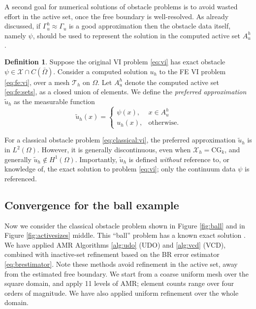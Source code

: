\documentclass[]{interact}
\theoremstyle{plain}%
\theoremstyle{definition}
\newtheorem{definition}[theorem]{Definition}
\theoremstyle{remark}
\newcommand{\cT}{\mathcal{T}}
\newcommand{\cX}{\mathcal{X}}
\newcommand{\CG}{\text{CG}}
\begin{document}
A second goal for numerical solutions of obstacle problems is to avoid wasted effort in the active set, once the free boundary is well-resolved.  As already discussed, if $\Gamma_u^h \approx \Gamma_u$ is a good approximation then the obstacle data itself, namely $\psi$, should be used to represent the solution in the computed active set $A_u^h$.

\begin{definition} \label{def:preferred}
Suppose the original VI problem \eqref{eq:vi} has exact obstacle $\psi \in \cX\cap C(\bar\Omega)$.  Consider a computed solution $u_h$ to the FE VI problem \eqref{eq:fe:vi}, over a mesh $\cT_h$ on $\Omega$.  Let $A_u^h$ denote the computed active set \eqref{eq:fe:sets}, as a closed union of elements.  We define the \emph{preferred approximation} $\tilde u_h$ as the measurable function
\begin{equation}
\tilde u_h(x) = \begin{cases} \psi(x), & x\in A_u^h \\ u_h(x), & \text{otherwise.} \end{cases}
\end{equation}
\end{definition}

For a classical obstacle problem \eqref{eq:classical:vi}, the preferred approximation $\tilde u_h$ is in $L^2(\Omega)$.  However, it is generally discontinuous, even when $\cX_h=\CG_k$, and generally $\tilde u_h \notin H^1(\Omega)$.  Importantly, $\tilde u_h$ is defined \emph{without} reference to, or knowledge of, the exact solution to problem \eqref{eq:vi}; only the continuum data $\psi$ is referenced.

\subsection{Convergence for the ball example} \label{subsec:convergence}  Now we consider the classical obstacle problem shown in Figure \ref{fig:ball} and in Figure \ref{fig:activesizes} middle.  This ``ball'' problem has a known exact solution \cite[Chapter 12]{Bueler2021}.  We have applied AMR Algorithms \ref{alg:udo} (UDO) and \ref{alg:vcd} (VCD), combined with inactive-set refinement based on the BR error estimator \eqref{eq:brestimator}.  Note these methods avoid refinement in the active set, away from the estimated free boundary.  We start from a coarse uniform mesh over the square domain, and apply 11 levels of AMR; element counts range over four orders of magnitude.  We have also applied uniform refinement over the whole domain.
\end{document}
